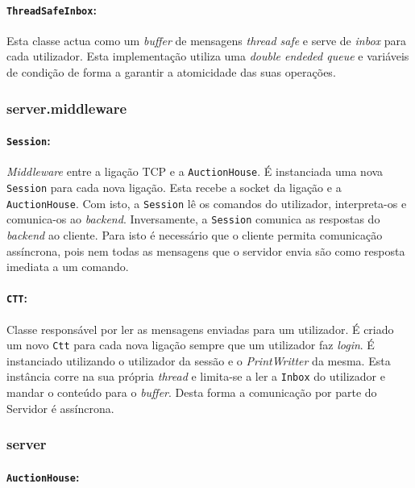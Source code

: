 \documentclass[a4paper]{article}
\begin{document}
\paragraph{\texttt{ThreadSafeInbox}:}

Esta classe actua como um \textit{buffer} de mensagens \textit{thread safe} e serve de \textit{inbox} para cada utilizador. Esta implementação utiliza uma \textit{double endeded queue} e variáveis de condição de forma a garantir a atomicidade das suas operações.

\subsubsection{server.middleware}
\paragraph{\texttt{Session}:}

\textit{Middleware} entre a ligação TCP e a \texttt{AuctionHouse}. É instanciada uma nova \texttt{Session} para cada nova ligação. Esta recebe a socket da ligação e a \texttt{AuctionHouse}. Com isto, a \texttt{Session} lê os comandos do utilizador, interpreta-os e comunica-os ao \textit{backend}. Inversamente, a \texttt{Session} comunica as respostas do \textit{backend} ao cliente. Para isto é necessário que o cliente permita comunicação assíncrona, pois nem todas as mensagens que o servidor envia são como resposta imediata a um comando.

\paragraph{\texttt{CTT}:}

Classe responsável por ler as mensagens enviadas para um utilizador. É criado um novo \texttt{Ctt} para cada nova ligação sempre que um utilizador faz \textit{login}. É instanciado utilizando o utilizador da sessão e o \textit{PrintWritter} da mesma. Esta instância corre na sua própria \textit{thread} e limita-se a ler a \texttt{Inbox} do utilizador e mandar o conteúdo para o \textit{buffer}. Desta forma a comunicação por parte do Servidor é assíncrona.

\subsubsection{server}
\paragraph{\texttt{AuctionHouse}:}
\end{document}
